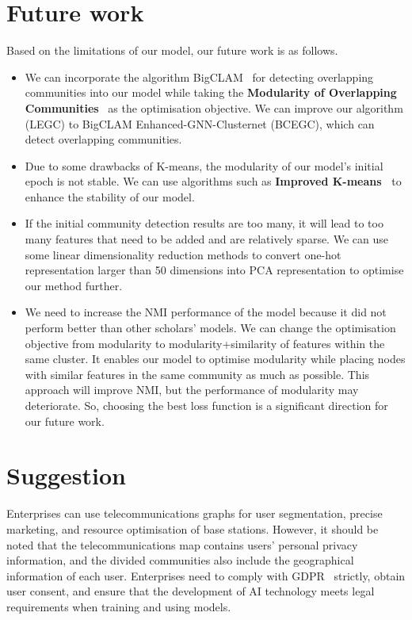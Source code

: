 \documentclass[ %
                    author={Tengyao Tu},
                supervisor={Dr. James Pope},
                    degree={MSc},
                     title={A New Perspective on Graph Community Detection: Combining Traditional Methods with Deep Learning Approaches},
                  subtitle={Applying to Telecom Networks and Diverse Datasets},
                      type={},
                      year={2024}]{dissertation}
\begin{document}
\section{ Future work}
Based on the limitations of our model, our future work is as follows.
\begin{itemize}
\item We can incorporate the algorithm BigCLAM~\cite{yang2013overlapping} for detecting overlapping communities into our model while taking the \textbf{Modularity of Overlapping Communities}~\cite{fortunato2007resolution} as the optimisation objective. We can improve our algorithm (LEGC) to BigCLAM Enhanced-GNN-Clusternet (BCEGC), which can detect overlapping communities.
\item Due to some drawbacks of K-means, the modularity of our model's initial epoch is not stable. We can use algorithms such as \textbf{Improved K-means~\cite{na2010research}} to enhance the stability of our model.


\item If the initial community detection results are too many, it will lead to too many features that need to be added and are relatively sparse. We can use some linear dimensionality reduction methods to convert one-hot representation larger than 50 dimensions into PCA representation to optimise our method further.

\item We need to increase the NMI performance of the model because it did not perform better than other scholars' models. We can change the optimisation objective from modularity to modularity+similarity of features within the same cluster. It enables our model to optimise modularity while placing nodes with similar features in the same community as much as possible. This approach will improve NMI, but the performance of modularity may deteriorate. So, choosing the best loss function is a significant direction for our future work.


\end{itemize}
\section{Suggestion}
Enterprises can use telecommunications graphs for user segmentation, precise marketing, and resource optimisation of base stations. However, it should be noted that the telecommunications map contains users' personal privacy information, and the divided communities also include the geographical information of each user. Enterprises need to comply with GDPR~\cite{voigt2017eu} strictly, obtain user consent, and ensure that the development of AI technology meets legal requirements when training and using models.
\end{document}
